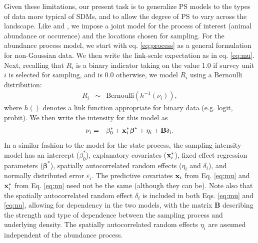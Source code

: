 \documentclass[times,mee,doublespace,]{besauth2}
\begin{document}
Given these limitations, our present task is to generalize PS models to the types of data more typical of SDMs, and to allow the degree of PS to vary across the landscape.  Like \citet{DiggleEtAl2010} and \citet{PatiEtAl2011}, we impose a joint model for the process of interest (animal abundance or occurence) and the locations chosen for sampling. For the abundance process model, we start with eq. \ref{eq:process} as a general formulation for non-Gaussian data.  We then write the link-scale expectation as in eq. \ref{eq:mu}. 
Next, recalling that $R_i$ is a binary indicator taking on the value 1.0 if survey unit $i$ is selected for sampling, and is 0.0 otherwise, we model $R_i$ using a Bernoulli distribution:
\begin{eqnarray}
 \label{eq:R}
  R_i & \sim & \text{Bernoulli}(h^{-1}(\nu_i)),
\end{eqnarray}
where $h()$ denotes a link function appropriate for binary data (e.g. logit, probit).  We then write the intensity for this model as
\begin{eqnarray}
  \label{eq:nu}
  \nu_i & = & \beta_0^* + {\bf x}_i^* \boldsymbol{\beta}^*+\eta_i+{\bf B} \delta_i.
\label{eq:nu}
\end{eqnarray}
 In a similar fashion to the model for the state process, the sampling intensity model has an intercept ($\beta_0^*$), explanatory covariates (${\bf x}_i^*$), fixed effect regression parameters ($\boldsymbol{\beta}^*$), spatially autocorrelated random effects ($\eta_i$ and $\delta_i$), and normally distributed error $\varepsilon_i$.  The predictive covariates ${\bf x}_i$ from Eq. \ref{eq:mu} and ${\bf x}_i^*$ from Eq. \ref{eq:nu} need not be the same (although they can be).  Note also that the  spatially autocorrelated random effect $\delta_i$ is included in both Eqs. \ref{eq:mu} and \ref{eq:nu}, allowing for dependency in the two models, with the matrix {\bf B} describing the strength and type of dependence between the sampling process and underlying density.  The spatially autocorrelated random effects $\eta_i$ are assumed independent of the abundance process.
\end{document}
